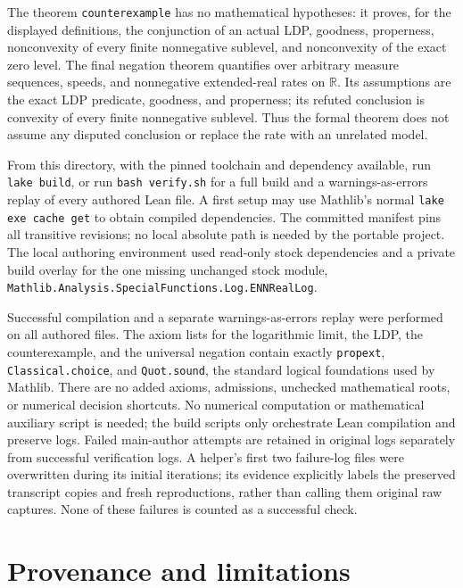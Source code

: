 \documentclass[11pt]{article}
\newcommand{\R}{\mathbb R}
\begin{document}
The theorem \texttt{counterexample} has no mathematical hypotheses: it
proves, for the displayed definitions, the conjunction of an actual LDP,
goodness, properness, nonconvexity of every finite nonnegative sublevel, and
nonconvexity of the exact zero level. The final negation theorem quantifies
over arbitrary measure sequences, speeds, and nonnegative extended-real
rates on $\R$. Its assumptions are the exact LDP predicate, goodness, and
properness; its refuted conclusion is convexity of every finite nonnegative
sublevel. Thus the formal theorem does not assume any disputed conclusion
or replace the rate with an unrelated model.

From this directory, with the pinned toolchain and dependency available,
run \texttt{lake build}, or run \texttt{bash verify.sh} for a full build and
a warnings-as-errors replay of every authored Lean file. A first setup may
use Mathlib's normal \texttt{lake exe cache get} to obtain compiled
dependencies. The committed manifest pins all transitive revisions; no
local absolute path is needed by the portable project. The local authoring
environment used read-only stock dependencies and a private build overlay
for the one missing unchanged stock module,
\texttt{Mathlib.Analysis.\allowbreak{}SpecialFunctions.\allowbreak{}Log.\allowbreak{}ENNRealLog}.

Successful compilation and a separate warnings-as-errors replay were
performed on all authored files. The axiom lists for the logarithmic limit,
the LDP, the counterexample, and the universal negation contain exactly
\texttt{propext}, \texttt{Classical.choice}, and \texttt{Quot.sound}, the
standard logical foundations used by Mathlib. There are no added axioms,
admissions, unchecked mathematical roots, or numerical decision shortcuts.
No numerical computation or mathematical auxiliary script is needed; the
build scripts only orchestrate Lean compilation and preserve logs. Failed
main-author attempts are retained in original logs separately from successful
verification logs. A helper's first two failure-log files were overwritten
during its initial iterations; its evidence explicitly labels the preserved
transcript copies and fresh reproductions, rather than calling them original
raw captures. None of these failures is counted as a successful check.

\section{Provenance and limitations}
\end{document}
